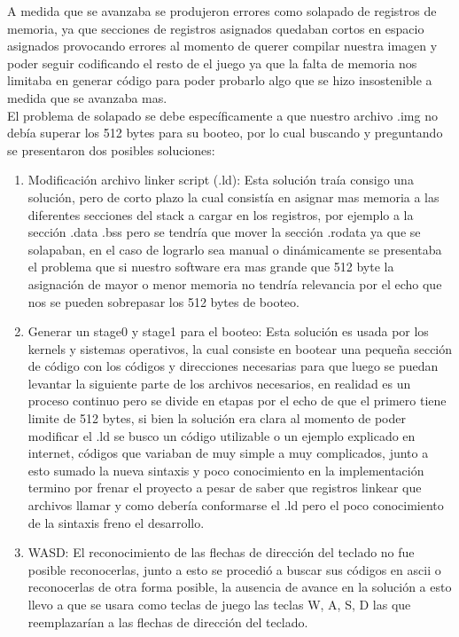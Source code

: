 \documentclass[twocolumn,11pts]{IEEEtran}
\begin{document}
    A medida que se avanzaba se produjeron errores como solapado de registros de memoria, ya que secciones de registros asignados quedaban cortos en espacio asignados provocando errores al momento de querer compilar nuestra imagen y poder seguir codificando el resto de el juego ya que la falta de memoria nos limitaba en generar código para poder probarlo algo que se hizo insostenible a medida que se avanzaba mas.
    \\
    El problema de solapado se debe específicamente a que nuestro archivo .img no debía superar los 512 bytes para su booteo, por lo cual buscando y preguntando se presentaron dos posibles soluciones:
\begin{enumerate}
    
\item Modificación archivo linker script (.ld): Esta solución traía consigo una solución, pero de corto plazo la cual consistía en asignar mas memoria a las diferentes secciones del stack a cargar en los registros, por ejemplo a la sección .data .bss pero se tendría que mover la sección .rodata ya que se solapaban, en el caso de lograrlo sea manual o dinámicamente se presentaba el problema que si nuestro software era mas grande que 512 byte la asignación de mayor o menor memoria no tendría relevancia por el echo que nos se pueden sobrepasar los 512 bytes de booteo.
\\    
\item Generar un stage0 y stage1 para el booteo: Esta solución es usada por los kernels y sistemas operativos, la cual consiste en bootear una pequeña sección de código con los códigos y direcciones necesarias para que luego se puedan levantar la siguiente parte de los archivos necesarios, en realidad es un proceso continuo pero se divide en etapas por el echo de que el primero tiene limite de 512 bytes, si bien la solución era clara al momento de poder modificar el .ld se busco un código utilizable o un ejemplo explicado en internet, códigos que variaban de muy simple a muy complicados, junto a esto sumado la nueva sintaxis y poco conocimiento en la implementación termino por frenar el proyecto a pesar de saber que registros linkear que archivos llamar y como debería conformarse el .ld pero el poco conocimiento de la sintaxis freno el desarrollo.
\\
\item WASD: El reconocimiento de las flechas de dirección del teclado no fue posible reconocerlas, junto a esto se procedió a buscar sus códigos en ascii o reconocerlas de otra forma posible, la ausencia de avance en la solución a esto llevo a que se usara como teclas de juego las teclas W, A, S, D las que reemplazarían a las flechas de dirección del teclado.
\end{enumerate}
\\
\end{document}
